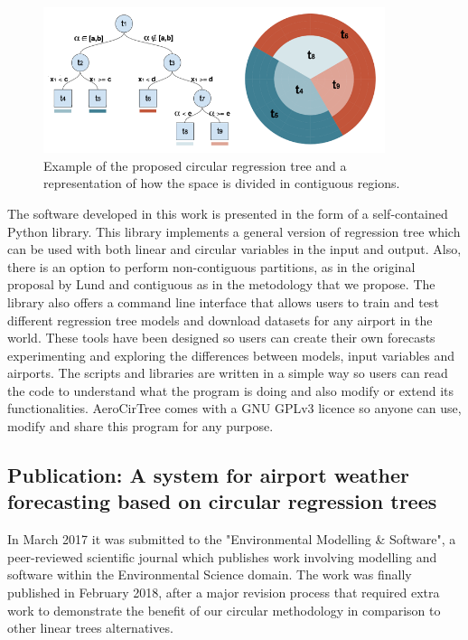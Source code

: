 \medskip

\begin{figure}[h]
 \centerline{\includegraphics[width=10cm]{paper2.png}}\caption{Example of the proposed circular regression tree and a representation of how the space is divided in contiguous regions.}\label{paper2}
\end{figure}

The software developed in this work is presented in the form of a self-contained Python library. This library implements a general version of regression tree which can be used with both linear and circular variables in the input and output. Also, there is an option to perform non-contiguous partitions, as in the original proposal by Lund \citep{lund2002tree} and contiguous as in the metodology that we propose.  The library also offers a command line interface that allows users to train and test different regression tree models and download datasets for any airport in the world. These tools have been designed so users can create their own forecasts experimenting and exploring the differences between models, input variables and airports. The scripts and libraries are written in a simple way so users can read the code to understand what the program is doing and also modify or extend its functionalities. AeroCirTree comes with a GNU GPLv3 licence so anyone can use, modify and share this program for any purpose.

\subsection{Publication: A system for airport weather forecasting based on circular regression trees}

In March 2017 it was submitted to the "Environmental Modelling \& Software", a peer-reviewed scientific journal which publishes work involving modelling and software within the Environmental Science domain. The work was finally published in February 2018, after a major revision process that required extra work to demonstrate the benefit of our circular methodology in comparison to other linear trees alternatives.

